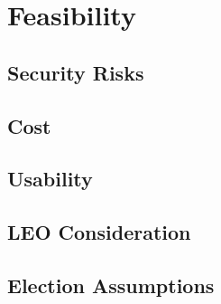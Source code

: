 \chapter{Feasibility}

\section{Security Risks}
\section{Cost}
\section{Usability}
\section{LEO Consideration}
\section{Election Assumptions}
